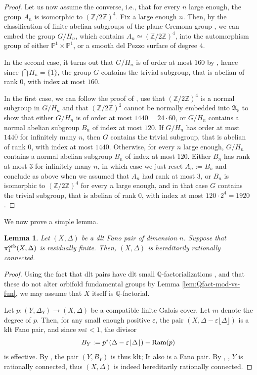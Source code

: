 \documentclass{amsart}
\newcommand{\pp}{\mathbb{P}}
\newcommand{\qq}{\mathbb{Q}}
\newcommand{\zz}{\mathbb{Z}}
\newtheorem{lemma}[theorem]{Lemma}
\theoremstyle{definition}
\theoremstyle{remark}
\numberwithin{equation}{section}
\begin{document}
\begin{proof}
\medskip

Let us now assume the converse, i.e., that for every $n$ large enough, the group $A_n$ is isomorphic to $(\zz/2\zz)^4$. Fix a large enough $n$. Then, by the classification of finite abelian subgroups of the plane Cremona group \cite{Bla07}, we can embed the group $G/H_n$, which contains $A_n\simeq (\zz/2\zz)^4$, into the automorphism group of either $\pp^1\times \pp^1$, or a smooth del Pezzo surface of degree $4$. 

In the second case, it turns out that $G/H_n$ is of order at most $160$ by \cite[Theorem 1.1]{Hos96}, hence since $\bigcap H_n =\{1\}$, the group $G$ contains the trivial subgroup, that is abelian of rank $0$, with index at most $160$.

In the first case, we can follow the proof of \cite[Propositions 3.2 and 3.3 (Case $d=8$)]{Yas19}, use that $(\zz/2\zz)^4$ is a normal subgroup in $G/H_n$ and that $(\zz/2\zz)^2$ cannot be normally embedded into $\mathfrak{A}_5$ to show that either $G/H_n$ is of order at most $1440= 24\cdot 60$, or $G/H_n$ contains a normal abelian subgroup $B_n$ of index at most $120$. If $G/H_n$ has order at most $1440$ for infinitely many $n$, then $G$ contains the trivial subgroup, that is abelian of rank $0$, with index at most $1440$. Otherwise, for every $n$ large enough, $G/H_n$ contains a normal abelian subgroup $B_n$ of index at most $120$. Either $B_n$ has rank at most $3$ for infinitely many $n$, in which case we just reset $A_n := B_n$ and conclude as above when we assumed that $A_n$ had rank at most $3$, or $B_n$ is isomorphic to $(\zz/2\zz)^4$ for every $n$ large enough, and in that case $G$ contains the trivial subgroup, that is abelian of rank $0$, with index at most $120\cdot 2^4 = 1920$.
\end{proof}

We now prove a simple lemma.

\begin{lemma}\label{lem:fano-herratcon}
    Let $(X,\Delta)$ be a dlt Fano pair of dimension $n$. Suppose that $\pi_1^{\rm orb}(X,\Delta)$ is residually finite.
    Then, $(X,\Delta)$ is hereditarily rationally connected.
\end{lemma}

\begin{proof}
Using the fact that dlt pairs have dlt small $\qq$-factorializations \cite[Corollary 1.37]{Kol13}, and that these do not alter orbifold fundamental groups by Lemma \ref{lem:Qfact-mod-vs-fun}, we may assume that $X$ itself is $\qq$-factorial.

Let $p:(Y,\Delta_Y)\to (X,\Delta)$ be a compatible finite Galois cover. Let $m$ denote the degree of $p$. Then, for any small enough positive $\varepsilon$, the pair $(X,\Delta - \varepsilon\lfloor \Delta\rfloor)$ is a klt Fano pair, and since $m\varepsilon < 1$, the divisor
$$B_Y := p^*(\Delta - \varepsilon\lfloor \Delta\rfloor) - {\rm Ram}(p)$$
is effective. By \cite[Proposition 5.20]{KM98}, the pair $(Y,B_{Y})$ is thus klt; It also is a Fano pair.
By \cite{Zha06}, \cite{HM07}, $Y$ is rationally connected, thus $(X,\Delta)$ is indeed hereditarily rationally connected.
\end{proof}
\end{document}
